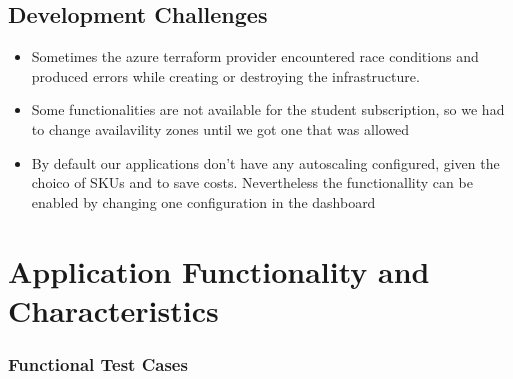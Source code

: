 \documentclass{llncs}
\begin{document}
\subsection{Development Challenges}
\begin{itemize}
    \item Sometimes the azure terraform provider encountered race conditions and produced errors while creating or destroying the infrastructure.
    \item Some functionalities are not available for the student subscription, so we had to change availavility zones until we got one that was allowed
    \item By default our applications don't have any autoscaling configured, given the choico of SKUs and to save costs.
          Nevertheless the functionallity can be enabled by changing one configuration in the dashboard
\end{itemize}

\section{Application Functionality and Characteristics}

\subsubsection{Functional Test Cases}
\end{document}
